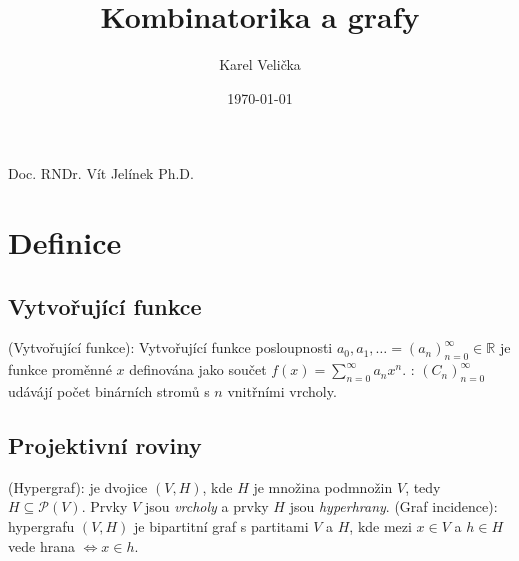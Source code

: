 \documentclass[10pt,a4paper]{article}
\title{Kombinatorika a grafy}
\date{\today}
\author{\sc Karel Velička}
\newcommand{\R}{{\mathbb{R}}}       %
\newcommand{\Pp}{{\mathcal{P}}}     %
\begin{document}
\maketitle

\begin{center}
    Doc. RNDr. Vít Jelínek Ph.D.
\end{center}

\tableofcontents
\newpage

\section{Definice}

\subsection{Vytvořující funkce}

 (Vytvořující funkce): \normalfont Vytvořující funkce posloupnosti $a_0, a_1, \ldots = (a_n)_{n=0}^{\infty} \in \R$ je funkce proměnné $x$ definována jako součet $f(x) = \displaystyle \sum_{n=0}^{\infty}a_nx^n$.
: \normalfont $(C_n)_{n=0}^{\infty}$ udávájí počet binárních stromů s $n$ vnitřními vrcholy.

\subsection{Projektivní roviny}
 (Hypergraf): \normalfont je dvojice $(V,H)$, kde $H$ je množina podmnožin $V$, tedy $H\subseteq \Pp(V)$. Prvky $V$ jsou \textit{vrcholy} a prvky $H$ jsou \textit{hyperhrany}.
 (Graf incidence): \normalfont hypergrafu $(V,H)$ je bipartitní graf s partitami $V$ a $H$, kde mezi $x \in V$ a $h \in H$ vede hrana $\iff x \in h$.
\end{document}
